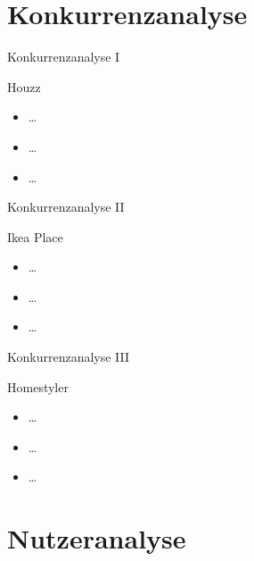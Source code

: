 \documentclass[presentation,bigger,aspectratio=169]{beamer}
\begin{document}
\section{Konkurrenzanalyse}
\label{sec:orgfaa0c0d}
\begin{frame}[label={sec:org764d8fa}]{\vspace{2.2cm}\begin{center}\MakeUppercase{\insertsection}\end{center}}
\end{frame}

\begin{frame}[label={sec:orgf305772}]{Konkurrenzanalyse I}
\begin{block}{Houzz}
\begin{itemize}
\item \ldots{}
\item \ldots{}
\item \ldots{}
\end{itemize}
\end{block}
\end{frame}
\begin{frame}[label={sec:org6265980}]{Konkurrenzanalyse II}
\begin{block}{Ikea Place}
\begin{itemize}
\item \ldots{}
\item \ldots{}
\item \ldots{}
\end{itemize}
\end{block}
\end{frame}
\begin{frame}[label={sec:org08c0fe9}]{Konkurrenzanalyse III}
\begin{block}{Homestyler}
\begin{itemize}
\item \ldots{}
\item \ldots{}
\item \ldots{}
\end{itemize}
\end{block}
\end{frame}
\section{Nutzeranalyse}
\label{sec:org72d4628}
\begin{frame}[label={sec:org0acf3ff}]{\vspace{2.2cm}\begin{center}\MakeUppercase{\insertsection}\end{center}}
\end{frame}
\end{document}
